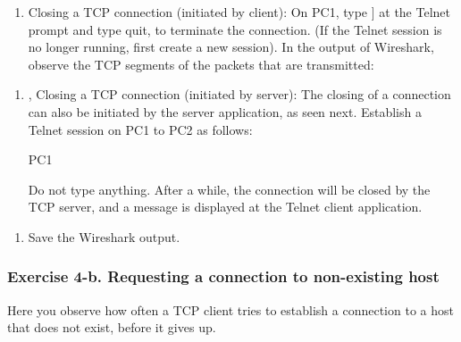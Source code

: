 \begin{enumerate}[resume]
	\item Closing a TCP connection (initiated by client): On PC1, type ] at the Telnet prompt and type quit, to terminate the connection. (If the Telnet session is no longer running, first create a new session).
		In the output of Wireshark, observe the TCP segments of the packets that are transmitted:
\end{enumerate}

\begin{questions}
\end{questions}

\begin{enumerate}[resume]
	\item, Closing a TCP connection (initiated by server): The closing of a connection can also be initiated by the server application, as seen next.
		Establish a Telnet session on PC1 to PC2 as follows: 
		\begin{cmdblock}
	PC1%
		\end{cmdblock}
		Do not type anything. After a while, the connection will be closed by the TCP server, and a message is displayed at the Telnet client application.
\end{enumerate}

\begin{questions}
\end{questions}

\begin{enumerate}[resume]
	\item Save the Wireshark output.
\end{enumerate}

\subsubsection{Exercise 4-b. Requesting a connection to non-existing host}

Here you observe how often a TCP client tries to establish a connection to a host that does not exist, before it gives up.

